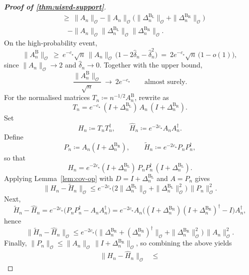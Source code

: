 \documentclass[11pt,a4paper]{article}
\newcommand{\be}{\begin{equation}}
\newcommand{\ee}{\end{equation}}
\newcommand{\op}{\mathcal{O}}
\begin{document}
\begin{proof}[\textbf{Proof of \cref{thm:uisvd-support}}]
\begin{equation}
\begin{aligned}
&\ \ge\ \|A_n\|_{\op}-\|A_n\|_{\op}\big(\|\Delta^{\mathrm{B_L}}_{n}\|_{\op}+\|\Delta^{\mathrm{B_R}}_{n}\|_{\op}\big)\\
&\quad-\|A_n\|_{\op}\|\Delta^{\mathrm{B_L}}_{n}\|_{\op}\|\Delta^{\mathrm{B_R}}_{n}\|_{\op}.
\end{aligned}
\end{equation}
On the high-probability event,
\begin{equation}
\|A^{\mathrm{B}}_n\|_{\op}
\ \ge\ e^{-c_\star}\sqrt n\,\|A_n\|_{\op}\,\Big(1-2\hat \delta_n-\hat \delta_n^2\Big)
\ =\ 2e^{-c_\star}\sqrt n\,\big(1-o(1)\big),
\end{equation}
since $\|A_n\|_{\op}\to 2$ and $\hat \delta_n\to 0$. Together with the upper bound,
\begin{equation}
\frac{\|A^{\mathrm{B}}_n\|_{\op}}{\sqrt n}\ \longrightarrow\ 2e^{-c_\star}\qquad\text{almost surely}.
\end{equation}
For the normalised matrices $T_n\coloneq n^{-1/2}A^{\mathrm{B}}_n$, rewrite as
\begin{equation}\label{eq:97ref}
T_n=e^{-c_\star}\,(I+\Delta^{\mathrm{B_L}}_{n})\,A_n\,(I+\Delta^{\mathrm{B_R}}_{n}).
\end{equation}
Set
\begin{equation}
H_n\coloneq T_nT_n^\dagger,\qquad \widehat H_n\coloneq e^{-2c_\star}A_nA_n^\dagger.
\end{equation}
Define
\be
P_n\coloneq A_n(I+\Delta^{\mathrm{B_R}}_{n}),\qquad 
\widetilde H_n\coloneq e^{-2c_\star}P_nP_n^\dagger,
\ee
so that
\be
H_n=e^{-2c_\star}(I+\Delta^{\mathrm{B_L}}_{n})\,P_nP_n^\dagger\,(I+\Delta^{\mathrm{B_L}}_{n}).
\ee
Applying Lemma~\ref{lem:cov-op} with $D=I+\Delta^{\mathrm{B_L}}_{n}$ and $A=P_n$ gives
\be
\|H_n-\widetilde H_n\|_{\op}\le e^{-2c_\star}\bigl(2\|\Delta^{\mathrm{B_L}}_{n}\|_{\op}+\|\Delta^{\mathrm{B_L}}_{n}\|_{\op}^2\bigr)\,\|P_n\|_{\op}^2.
\ee
Next,
\be
\widetilde H_n-\widehat H_n
=e^{-2c_\star}\Big(P_nP_n^\dagger-A_nA_n^\dagger\Big)
=e^{-2c_\star}A_n\Big((I+\Delta^{\mathrm{B_R}}_{n})(I+\Delta^{\mathrm{B_R}}_{n})^\dagger-I\Big)A_n^\dagger,
\ee
hence
\be
\|\widetilde H_n-\widehat H_n\|_{\op}
\le e^{-2c_\star}\bigl(\|\Delta^{\mathrm{B_R}}_{n}+(\Delta^{\mathrm{B_R}}_{n})^\dagger\|_{\op}+\|\Delta^{\mathrm{B_R}}_{n}\|_{\op}^2\bigr)\,\|A_n\|_{\op}^2.
\ee
Finally, $\|P_n\|_{\op}\le \|A_n\|_{\op}\,\|I+\Delta^{\mathrm{B_R}}_{n}\|_{\op}$, so combining the above yields
\begin{equation}
\begin{aligned}
\|H_n-\widehat H_n\|_{\op}
\;&\le\;

\end{aligned}
\end{equation}
\end{proof}
\end{document}
